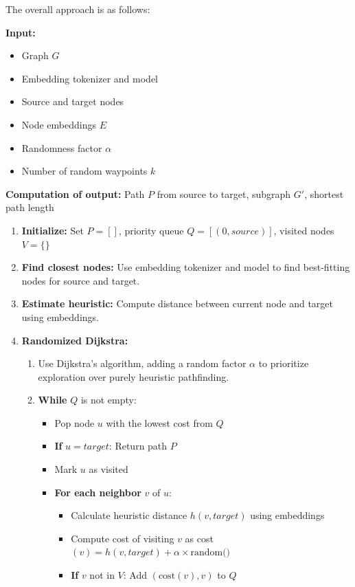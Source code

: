 \documentclass{article}
\begin{document}
The overall approach is as follows:
\begin{tcolorbox}[colback=blue!5!white, colframe=blue!75!black, title=Heuristic Pathfinding with Randomization and Waypoints]
\textbf{Input:} 
\begin{itemize}
    \item Graph $G$
    \item Embedding tokenizer and model
    \item Source and target nodes
    \item Node embeddings $E$
    \item Randomness factor $\alpha$
    \item Number of random waypoints $k$
\end{itemize}
\textbf{Computation of output:} Path $P$ from source to target, subgraph $G'$, shortest path length
\begin{enumerate}
    \item \textbf{Initialize:} Set $P = []$, priority queue $Q = [(0, source)]$, visited nodes $V = \{\}$
    \item \textbf{Find closest nodes:} Use embedding tokenizer and model to find best-fitting nodes for source and target.
    \item \textbf{Estimate heuristic:} Compute distance between current node and target using embeddings.
    \item \textbf{Randomized Dijkstra:}
    \begin{enumerate}
        \item Use Dijkstra's algorithm, adding a random factor $\alpha$ to prioritize exploration over purely heuristic pathfinding.
        \item \textbf{While} $Q$ is not empty:
        \begin{itemize}
            \item Pop node $u$ with the lowest cost from $Q$
            \item \textbf{If} $u = target$: Return path $P$
            \item Mark $u$ as visited
            \item \textbf{For each neighbor} $v$ of $u$:
            \begin{itemize}
                \item Calculate heuristic distance $h(v, target)$ using embeddings
                \item Compute cost of visiting $v$ as cost$(v) = h(v, target) + \alpha \times \text{random()}$
                \item \textbf{If} $v$ not in $V$: Add $(\text{cost}(v), v)$ to $Q$

\end{itemize}
\end{itemize}
\end{enumerate}
\end{enumerate}
\end{tcolorbox}
\end{document}
